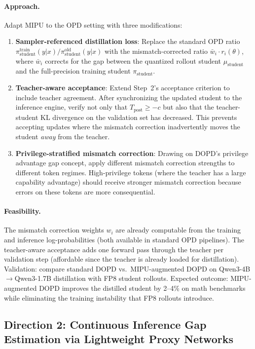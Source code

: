 \documentclass[11pt,a4paper]{article}
\begin{document}
\paragraph{Approach.} Adapt MIPU to the OPD setting with three modifications:
\begin{enumerate}
\item \textbf{Sampler-referenced distillation loss}: Replace the standard OPD ratio $\pi_{\mathrm{student}}^{\mathrm{train}}(y|x) / \pi_{\mathrm{student}}^{\mathrm{old}}(y|x)$ with the mismatch-corrected ratio $\bar{w}_i \cdot r_i(\theta)$, where $\bar{w}_i$ corrects for the gap between the quantized rollout student $\mu_{\mathrm{student}}$ and the full-precision training student $\pi_{\mathrm{student}}$.
\item \textbf{Teacher-aware acceptance}: Extend Step~2's acceptance criterion to include teacher agreement. After synchronizing the updated student to the inference engine, verify not only that $\hat{T}_{\mathrm{post}} \geq -c$ but also that the teacher-student KL divergence on the validation set has decreased. This prevents accepting updates where the mismatch correction inadvertently moves the student \emph{away} from the teacher.
\item \textbf{Privilege-stratified mismatch correction}: Drawing on DOPD's privilege advantage gap concept, apply different mismatch correction strengths to different token regimes. High-privilege tokens (where the teacher has a large capability advantage) should receive stronger mismatch correction because errors on these tokens are more consequential.
\end{enumerate}

\paragraph{Feasibility.} The mismatch correction weights $w_i$ are already computable from the training and inference log-probabilities (both available in standard OPD pipelines). The teacher-aware acceptance adds one forward pass through the teacher per validation step (affordable since the teacher is already loaded for distillation). Validation: compare standard DOPD vs.\ MIPU-augmented DOPD on Qwen3-4B$\to$Qwen3-1.7B distillation with FP8 student rollouts. Expected outcome: MIPU-augmented DOPD improves the distilled student by 2--4\% on math benchmarks while eliminating the training instability that FP8 rollouts introduce.

\subsection{Direction 2: Continuous Inference Gap Estimation via Lightweight Proxy Networks}
\end{document}
